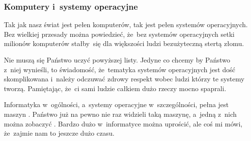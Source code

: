 \documentclass[10pt,t]{beamer}
\begin{document}
\begin{frame}
  \frametitle{Komputery i~systemy operacyjne}


  Tak jak nasz świat jest pełen komputerów, tak jest pełen systemów
  operacyjnych. Bez wielkiej przesady można powiedzieć, że~bez systemów
  operacyjnych setki milionów komputerów stałby~się dla większości ludzi
  bezużyteczną stertą złomu.

  \alert{Nie} muszą się Państwo uczyć powyższej listy. Jedyne co chcemy by
  Państwo z~niej wynieśli, to świadomość, że~tematyka systemów operacyjnych
  jest dość skomplikowana i~należy odczuwać zdrowy respekt wobec
  ludzi którzy te systemy tworzą. Pamiętając, że~ci sami ludzie
  całkiem dużo rzeczy mocno spaprali.

  Informatyka w~ogólności, a~systemy operacyjne w~szczególności, pełna jest
  maszyn
  . Państwo już na pewno nie raz
  widzieli taką maszynę, a~jedną z~nich można zobaczyć
  .
  Bardzo dużo w~informatyce można uprościć, ale coś mi mówi, że~zajmie nam
  to jeszcze dużo czasu.










\end{frame}
\end{document}
